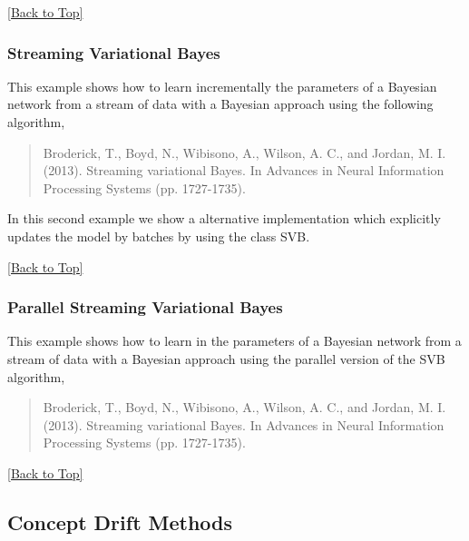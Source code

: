 \documentclass[10pt,a4paper]{article}
\begin{document}
\hyperref[sec:bns]{[Back to Top]}\newline 


\subsubsection{Streaming Variational Bayes}\label{sec:bns:learning:svb}
This example shows how to learn incrementally the parameters of a Bayesian network from a stream of data with a Bayesian approach using the following algorithm,

\begin{quotation}
Broderick, T., Boyd, N., Wibisono, A., Wilson, A. C., and Jordan, M. I. (2013). Streaming variational Bayes. In Advances in Neural Information Processing Systems (pp. 1727-1735).
\end{quotation}

In this second example we show a alternative implementation which explicitly updates the model by batches by using the class SVB.

\hyperref[sec:bns]{[Back to Top]}\newline 




\subsubsection{Parallel Streaming Variational Bayes}\label{sec:bns:learning:parallelsvb}
This example shows how to learn in the parameters of a Bayesian network from a stream of data with a Bayesian approach using the parallel version of the SVB algorithm,


\begin{quotation}
	Broderick, T., Boyd, N., Wibisono, A., Wilson, A. C., and Jordan, M. I. (2013). Streaming variational Bayes. In Advances in Neural Information Processing Systems (pp. 1727-1735).
\end{quotation}


\hyperref[sec:bns]{[Back to Top]}\newline 



\subsection{Concept Drift Methods}\label{sec:bns:conceptdrift}
\end{document}

